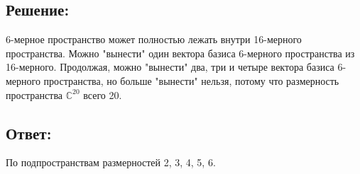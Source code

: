 \documentclass[12pt]{article}
\begin{document}
    \subsection*{Решение:}
    6-мерное пространство может полностью лежать внутри 16-мерного пространства. Можно "вынести"{} один вектора базиса 6-мерного пространства из 16-мерного. Продолжая, можно "вынести"{}
    два, три и четыре вектора базиса 6-мерного пространства, но больше "вынести"{} нельзя, потому что размерность пространства $\mathbb{C}^{20}$ всего 20.

    \subsection*{Ответ:}
    По подпространствам размерностей 2, 3, 4, 5, 6.
\end{document}
